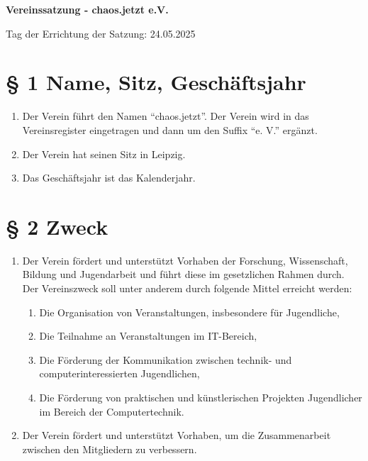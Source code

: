 \documentclass[11pt,a4paper]{scrartcl}
\begin{document}
\begin{center}
    \Huge\bfseries Vereinssatzung - chaos.jetzt e.V.
\end{center}
\vspace{0.5em}
\begin{center}
    Tag der Errichtung der Satzung: 24.05.2025
\end{center}
\vspace{1.5em}

\section*{§ 1 Name, Sitz, Geschäftsjahr}
\begin{enumerate}[label=\arabic*.]
    \item Der Verein führt den Namen \enquote{chaos.jetzt}. Der Verein wird in das Vereinsregister eingetragen und dann um den Suffix \enquote{e. V.} ergänzt.
    \item Der Verein hat seinen Sitz in Leipzig.
    \item Das Geschäftsjahr ist das Kalenderjahr.
\end{enumerate}

\section*{§ 2 Zweck}
\begin{enumerate}[label=\arabic*.]
    \item Der Verein fördert und unterstützt Vorhaben der Forschung, Wissenschaft, Bildung und Jugendarbeit und führt diese im gesetzlichen Rahmen durch. Der Vereinszweck soll unter anderem durch folgende Mittel erreicht werden:
    \begin{enumerate}[label=\roman*.]
        \item Die Organisation von Veranstaltungen, insbesondere für Jugendliche,
        \item Die Teilnahme an Veranstaltungen im IT-Bereich,
        \item Die Förderung der Kommunikation zwischen technik- und computerinteressierten Jugendlichen,
        \item Die Förderung von praktischen und künstlerischen Projekten Jugendlicher im Bereich der Computertechnik.
    \end{enumerate}
    \item Der Verein fördert und unterstützt Vorhaben, um die Zusammenarbeit zwischen den Mitgliedern zu verbessern.
\end{enumerate}
\end{document}
